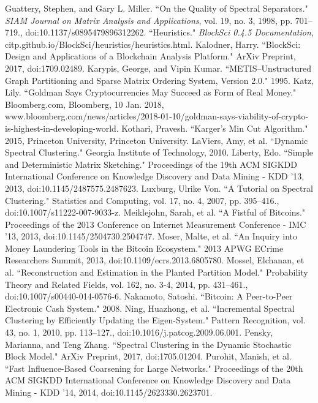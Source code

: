 \documentclass{article}
\begin{document}
\begin{thebibliography}{1}
 Guattery, Stephen, and Gary L. Miller. ``On the Quality of Spectral Separators." \textit{SIAM Journal on Matrix Analysis and Applications}, vol. 19, no. 3, 1998, pp. 701–719., doi:10.1137/s0895479896312262. 
 ``Heuristics." \textit{BlockSci 0.4.5 Documentation}, citp.github.io/BlockSci/heuristics/heuristics.html. 
 Kalodner, Harry. ``BlockSci: Design and Applications of a Blockchain Analysis Platform." ArXiv Preprint, 2017, doi:1709.02489.
 Karypis, George, and Vipin Kumar. ``METIS--Unstructured Graph Partitioning and Sparse Matrix Ordering System, Version 2.0." 1995.
 Katz, Lily. ``Goldman Says Cryptocurrencies May Succeed as Form of Real Money." Bloomberg.com, Bloomberg, 10 Jan. 2018, www.bloomberg.com/news/articles/2018-01-10/goldman-says-viability-of-crypto-is-highest-in-developing-world.
 Kothari, Pravesh. ``Karger's Min Cut Algorithm." 2015, Princeton University, Princeton University.
 LaViers, Amy, et al. ``Dynamic Spectral Clustering." Georgia Institute of Technology, 2010.
 Liberty, Edo. ``Simple and Deterministic Matrix Sketching." Proceedings of the 19th ACM SIGKDD International Conference on Knowledge Discovery and Data Mining - KDD '13, 2013, doi:10.1145/2487575.2487623.
 Luxburg, Ulrike Von. ``A Tutorial on Spectral Clustering." Statistics and Computing, vol. 17, no. 4, 2007, pp. 395–416., doi:10.1007/s11222-007-9033-z.
 Meiklejohn, Sarah, et al. ``A Fistful of Bitcoins." Proceedings of the 2013 Conference on Internet Measurement Conference - IMC '13, 2013, doi:10.1145/2504730.2504747.
 Moser, Malte, et al. ``An Inquiry into Money Laundering Tools in the Bitcoin Ecosystem." 2013 APWG ECrime Researchers Summit, 2013, doi:10.1109/ecrs.2013.6805780.
 Mossel, Elchanan, et al. ``Reconstruction and Estimation in the Planted Partition Model." Probability Theory and Related Fields, vol. 162, no. 3-4, 2014, pp. 431–461., doi:10.1007/s00440-014-0576-6.
 Nakamoto, Satoshi. ``Bitcoin: A Peer-to-Peer Electronic Cash System." 2008.
 Ning, Huazhong, et al. ``Incremental Spectral Clustering by Efficiently Updating the Eigen-System." Pattern Recognition, vol. 43, no. 1, 2010, pp. 113–127., doi:10.1016/j.patcog.2009.06.001.
 Pensky, Marianna, and Teng Zhang. ``Spectral Clustering in the Dynamic Stochastic Block Model." ArXiv Preprint, 2017, doi:1705.01204.
 Purohit, Manish, et al. ``Fast Influence-Based Coarsening for Large Networks." Proceedings of the 20th ACM SIGKDD International Conference on Knowledge Discovery and Data Mining - KDD '14, 2014, doi:10.1145/2623330.2623701.

\end{thebibliography}
\end{document}
